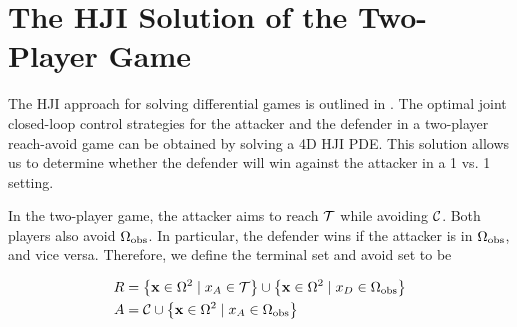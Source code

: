 \section{The HJI Solution of the Two-Player Game} \label{sec:solution_hji}
The HJI approach for solving differential games is outlined in \cite{Huang2011,j:mitchell-TAC-2005, LSToolbox}. The optimal joint closed-loop control strategies for the attacker and the defender in a two-player reach-avoid game can be obtained by solving a 4D HJI PDE. This solution allows us to determine whether the defender will win against the attacker in a 1 vs. 1 setting. 

In the two-player game, the attacker aims to reach $\mathcal{T}$ while avoiding $\mathcal{C}$. Both players also avoid $\Omega_{\text{obs}}$. In particular, the defender wins if the attacker is in $\Omega_{\text{obs}}$, and vice versa. Therefore, we define the terminal set and avoid set to be

\begin{equation} \label{eq:4DHJI_sets}
\begin{aligned}
R &= \left\{\xj\in\amb^2 \mid \xa\in\target \right\} \cup \left\{\xj\in\amb^2\mid \xb\in\obs \right\} \\
A &= \avoid \cup \left\{\xj\in\amb^2\mid \xa\in\obs \right\}
\end{aligned} 
\end{equation}

